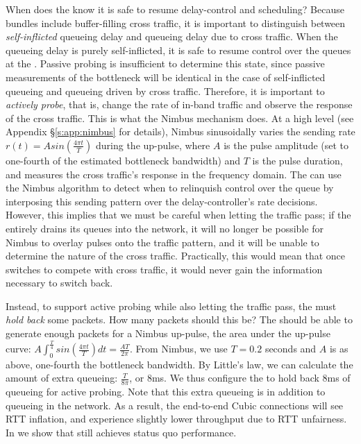 When does the \inbox know it is safe to resume delay-control and scheduling?
Because bundles include buffer-filling cross traffic, it is important to distinguish between \emph{self-inflicted} queueing delay and queueing delay due to cross traffic.
When the queueing delay is purely self-inflicted, it is safe to resume control over the queues at the \inbox.
Passive probing is insufficient to determine this state, since passive measurements of the bottleneck will be identical in the case of self-inflicted queueing and queueing driven by cross traffic.
Therefore, it is important to \emph{actively probe}, that is, change the rate of in-band traffic and observe the response of the cross traffic. 
This is what the Nimbus mechanism does.
At a high level (see Appendix \S\ref{s:app:nimbus} for details),
Nimbus sinusoidally varies the sending rate $r(t) = A sin(\frac{4\pi{}t}{T})$ during the up-pulse, where $A$ is the pulse amplitude (set to one-fourth of the estimated bottleneck bandwidth) and $T$ is the pulse duration, and measures the cross traffic's response in the frequency domain.
The \inbox can use the Nimbus algorithm to detect when to relinquish control over the queue by interposing this sending pattern over the delay-controller's rate decisions.
However, this implies that we must be careful when letting the traffic pass; if the \inbox entirely drains its queues into the network, it will no longer be possible for Nimbus to overlay pulses onto the traffic pattern, and it will be unable to determine the nature of the cross traffic.
Practically, this would mean that once \inbox switches to compete with cross traffic, it would never gain the information necessary to switch back.

Instead, to support active probing while also letting the traffic pass, the \inbox must \emph{hold back} some packets.
How many packets should this be? The \inbox should be able to generate enough packets for a Nimbus up-pulse, \ie the area under the up-pulse curve: 
$A \int_0^{\frac{T}{4}} sin(\frac{4\pi{}t}{T}) dt = \frac{AT}{2\pi}$.
From Nimbus, we use $T = 0.2$ seconds and $A$ is as above, one-fourth the bottleneck bandwidth. By Little's law, we can calculate the amount of extra queueing: $\frac{T}{8\pi}$, or $8$ms.
We thus configure the \inbox to hold back $8$ms of queueing for active probing.
Note that this extra queueing is in addition to queueing in the network. As a result, the end-to-end Cubic connections will see RTT inflation, and experience slightly lower throughput due to RTT unfairness. In  we show that \name still achieves status quo performance.

